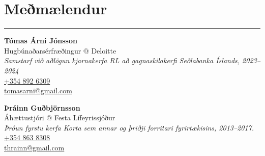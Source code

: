 \documentclass[a4paper,10pt]{article}
\newcommand{\cvheading}[1]{%
  {\headingfont\section*{#1}}
  \vspace{-0.2cm}
  \hrule
  \vspace{0.2cm}
}
\begin{document}
\cvheading{Meðmælendur}
\begin{multicols}{2}
  \raggedright
  \textbf{Tómas Árni Jónsson}\\[0.2cm]
  Hugbúnaðarsérfræðingur @ Deloitte\\[0.4cm]
  \textit{Samstarf við aðlögun kjarnakerfa RL að gagnaskilakerfi Seðlabanka Íslands, 2023--2024}\\[0.4cm]
  \href{tel:+3548926309}{{\color{accent}\faPhone\hspace{0.3em}+354 892 6309}}\\[0.4cm]
  \href{mailto:tomasarni@gmail.com}{{\color{accent}\faEnvelope\hspace{0.3em}tomasarni@gmail.com}}
  
  \columnbreak
  
  \textbf{Þráinn Guðbjörnsson}\\[0.2cm]
  Áhættustjóri @ Festa Lífeyrissjóður\\[0.4cm]
  \textit{Þróun fyrstu kerfa Korta sem annar og þriðji forritari fyrirtækisins, 2013–2017.}\\[0.4cm]
  \href{tel:+3548638308}{{\color{accent}\faPhone\hspace{0.3em}+354 863 8308}}\\[0.4cm]
  \href{mailto:thrainn@gmail.com}{{\color{accent}\faEnvelope\hspace{0.3em}thrainn@gmail.com}}
  \end{multicols}
  
\end{document}
